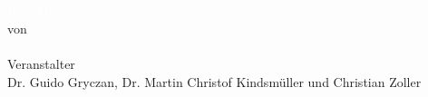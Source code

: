 \makeatletter
\thispagestyle{empty}

\vspace*{7.5cm}%
\noindent\textcolor{white}{\bfseries\sffamily\fontsize{48pt}{48pt}\selectfont\@title} \\[1mm]
\textcolor{white}{\LARGE\sffamily Projektbericht} \\[.5cm]
    {\large\sffamily von} \\[4pt]
    {\Large\sffamily \@author \\[1cm]}
    {\sffamily Veranstalter} \\[4pt]
    {\large\sffamily Dr. Guido Gryczan, Dr. Martin Christof Kindsmüller und Christian Zoller}

\makeatother